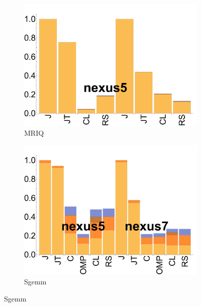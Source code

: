 \begin{figure}[ht]
  \begin{subfigure}[b]{0.3\textwidth}
      \includegraphics[width=\textwidth]{data/bbattery_mriq.pdf}
      \caption{MRIQ} \label{fig:b_MRIQ}
  \end{subfigure}

  \begin{subfigure}[b]{0.3\textwidth}
      \includegraphics[width=\textwidth]{data/bbattery_sgemm.pdf}
      \caption{Sgemm}\label{fig:b_Sgemm}
  \end{subfigure}


\end{figure}
